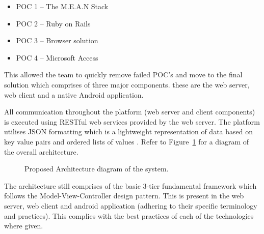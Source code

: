 \documentclass[12pt]{witseiepaper}
\begin{document}
\begin{itemize}
	\item POC 1 – The M.E.A.N Stack
	\item POC 2 – Ruby on Rails
	\item POC 3 – Browser solution
	\item POC 4 – Microsoft Access
\end{itemize}

 This allowed the team to quickly remove failed POC's and move to the final solution which comprises of three major components. these are the web server, web client and a native Android application.


All communication throughout the platform (web server and client components) is executed using RESTful web services provided by the web server. The platform utilises JSON formatting which is a lightweight representation of data based on key value pairs and ordered lists of values \cite{JSON}. Refer to Figure~\ref{fig:Arch} for a diagram of the overall architecture.

\begin{figure}[H]
  \caption{Proposed Architecture diagram of the system.} 
  \label{fig:Arch}
\end{figure}

The architecture still comprises of the basic 3-tier fundamental framework which follows the Model-View-Controller design pattern. This is present in the web server, web client and android application (adhering to their specific terminology and practices). This complies with the best practices of each of the technologies where given.
\end{document}
